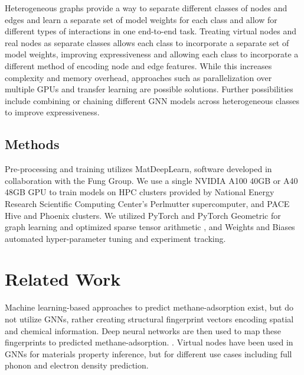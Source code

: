 \documentclass{lxaiproposal}
\begin{document}
Heterogeneous graphs provide a way to separate different classes of nodes and edges and learn a separate set of model weights for each class and allow for different types of interactions in one end-to-end task. Treating virtual nodes and real nodes as separate classes allows each class to incorporate a separate set of model weights, improving expressiveness and allowing each class to incorporate a different method of encoding node and edge features. While this increases complexity and memory overhead, approaches such as parallelization over multiple GPUs and transfer learning are possible solutions. Further possibilities include combining or chaining different GNN models across heterogeneous classes to improve expressiveness.

\subsection*{Methods}

Pre-processing and training utilizes MatDeepLearn\cite{fung2021benchmarking}, software developed in collaboration with the Fung Group. We use a single NVIDIA A100 40GB or A40 48GB GPU to train models on HPC clusters provided by National Energy Research Scientific Computing Center's Perlmutter supercomputer, and PACE Hive and Phoenix clusters\cite{PACE}. We utilized PyTorch\cite{pytorch} and PyTorch Geometric for graph learning and optimized sparse tensor arithmetic \cite{Fey2019FastGR}, and Weights and Biases\cite{wandb} automated hyper-parameter tuning and experiment tracking.

\section*{Related Work}

Machine learning-based approaches to predict methane-adsorption exist, but do not utilize GNNs, rather creating structural fingerprint vectors encoding spatial and chemical information. Deep neural networks are then used to map these fingerprints to predicted methane-adsorption. \cite{gurnani2021interpretable}. 
Virtual nodes have been used in GNNs for materials property inference, but for different use cases including full phonon\cite{https://doi.org/10.48550/arxiv.2010.09435} and electron density prediction\cite{jorgensen2022equivariant}.
\end{document}
